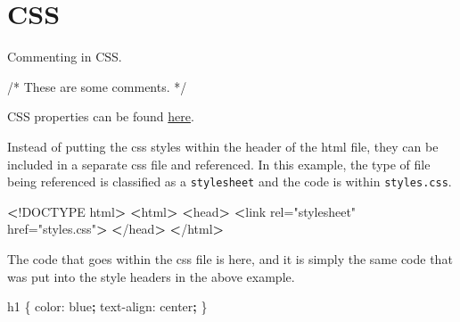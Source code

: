 \documentclass[]{book}
\newenvironment{Shaded}{\begin{snugshade}}{\end{snugshade}}
\newcommand{\ExtensionTok}[1]{#1}
\newcommand{\FunctionTok}[1]{\textcolor[rgb]{0.00,0.00,0.00}{#1}}
\newcommand{\KeywordTok}[1]{\textcolor[rgb]{0.13,0.29,0.53}{\textbf{#1}}}
\newcommand{\NormalTok}[1]{#1}
\newcommand{\OperatorTok}[1]{\textcolor[rgb]{0.81,0.36,0.00}{\textbf{#1}}}
\newcommand{\StringTok}[1]{\textcolor[rgb]{0.31,0.60,0.02}{#1}}
\begin{document}
\hypertarget{css}{%
\section{CSS}\label{css}}

Commenting in CSS.

\begin{Shaded}
\begin{Highlighting}[]
\ExtensionTok{/*}
\ExtensionTok{These}\NormalTok{ are some comments.}
\ExtensionTok{*/}
\end{Highlighting}
\end{Shaded}

CSS properties can be found \href{https://developer.mozilla.org/en-US/docs/Web/CSS/Reference}{here}.

Instead of putting the css styles within the header of the html file, they can be included in a separate css file and referenced.
In this example, the type of file being referenced is classified as a \texttt{stylesheet} and the code is within \texttt{styles.css}.

\begin{Shaded}
\begin{Highlighting}[]
\OperatorTok{<}\NormalTok{!}\ExtensionTok{DOCTYPE}\NormalTok{ html}\OperatorTok{>}         
\OperatorTok{<}\ExtensionTok{html}\OperatorTok{>}                  
    \OperatorTok{<}\FunctionTok{head}\OperatorTok{>}                                       
        \OperatorTok{<}\FunctionTok{link}\NormalTok{ rel=}\StringTok{"stylesheet"}\NormalTok{ href=}\StringTok{"styles.css"}\OperatorTok{>}
    \OperatorTok{<}\NormalTok{/}\ExtensionTok{head}\OperatorTok{>}                                      
\OperatorTok{<}\NormalTok{/}\ExtensionTok{html}\OperatorTok{>}                 
\end{Highlighting}
\end{Shaded}

The code that goes within the css file is here, and it is simply the same code that was put into the style headers in the above example.

\begin{Shaded}
\begin{Highlighting}[]
\ExtensionTok{h1}\NormalTok{ \{                   }
    \ExtensionTok{color}\NormalTok{: blue}\KeywordTok{;}       
    \ExtensionTok{text-align}\NormalTok{: center}\KeywordTok{;}
\NormalTok{\}                      }
\end{Highlighting}
\end{Shaded}
\end{document}
